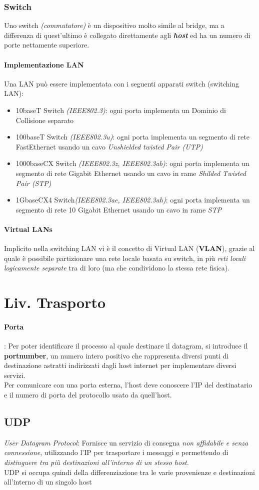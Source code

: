 \documentclass[a4paper,11pt]{article}
\def\subsub#1{\subsubsection{#1}\label{#1}}
\def\para#1{\paragraph{#1}\label{#1}}
\begin{document}
\subsub{Switch} Uno switch \textit{(commutatore)} è un dispositivo molto simile al bridge, ma a differenza di quest'ultimo è collegato direttamente agli \textbf{\textit{host}} ed ha un numero di porte nettamente superiore.
\para{Implementazione LAN} Una LAN può essere implementata con i seguenti apparati switch (switching LAN):
\begin{itemize}
\item 10baseT Switch \textit{(IEEE802.3)}: ogni porta implementa un Dominio di Collisione separato
\item 100baseT Switch \textit{(IEEE802.3u)}: ogni porta implementa un segmento di rete FastEthernet usando un cavo \textit{Unshielded twisted Pair (UTP)}
\item 1000baseCX Switch \textit{(IEEE802.3z, IEEE802.3ab)}: ogni porta implementa un segmento di rete Gigabit Ethernet usando un cavo in rame \textit{Shilded Twisted Pair (STP)}
\item 1GbaseCX4 Switch\textit{(IEEE802.3ae, IEEE802.3ah)}: ogni porta implementa un segmento di rete 10 Gigabit Ethernet usando un cavo in rame \textit{STP}
\end{itemize}
\para{Virtual LANs} Implicito nella switching LAN vi è il concetto di Virtual LAN (\textbf{VLAN}), grazie al quale è possibile partizionare una rete locale basata su switch, in più \textit{reti locali logicamente separate} tra di loro (ma che condividono la stessa rete fisica).



\newpage
\section{Liv. Trasporto}
\paragraph{Porta}: Per poter identificare il processo al quale destinare il datagram, si introduce il \textbf{portnumber}, un numero intero positivo che rappresenta diversi punti di destinazione astratti indirizzati dagli host internet per implementare diversi servizi.\\
Per comunicare con una porta esterna, l'host deve conoscere l'IP del destinatario e il numero di porta del protocollo usato da quell'host.
\subsection{UDP}
 \textit{User Datagram Protocol}: Fornisce un servizio di consegna \textit{non affidabile e senza connessione}, utilizzando l'IP per trasportare i messaggi e permettendo di \textit{distinguere tra più destinazioni all'interno di un stesso host.}\\
UDP si occupa quindi della differenziazione tra le varie provenienze e destinazioni all'interno di un singolo host
\end{document}
